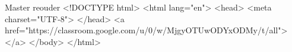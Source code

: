 Master
reouder
<!DOCTYPE html>
<html lang="en">
<head>
    <meta charset="UTF-8">
</head>
<a href="https://classroom.google.com/u/0/w/MjgyOTUwODYxODMy/t/all">
</a>
</body>
</html>
